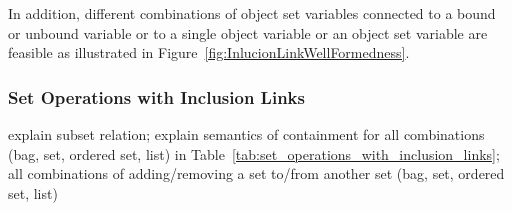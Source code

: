 In addition, different combinations of object set variables connected to a bound or unbound variable
or to a single object variable or an object set variable are feasible as illustrated in Figure~\ref{fig:InlucionLinkWellFormedness}.


\subsubsection{Set Operations with Inclusion Links}
\label{sec:StoryPatterns:inclusion:BagsSetsEtc}



explain subset relation;
explain semantics of containment for all combinations (bag, set, ordered set, list) in Table~\ref{tab:set_operations_with_inclusion_links};
all combinations of adding/removing a set to/from another set (bag, set, ordered set, list)

